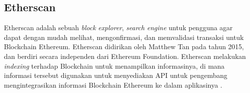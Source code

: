 \subsection{Etherscan}
\label{subsec:etherscan}

Etherscan adalah sebuah \textit{block explorer}, \textit{search engine} untuk pengguna agar dapat dengan mudah melihat, mengonfirmasi, dan memvalidasi transaksi untuk Blockchain Ethereum. Etherscan didirikan oleh Matthew Tan pada tahun 2015, dan berdiri secara independen dari Ethereum Foundation. Etherscan melakukan \textit{indexing} terhadap Blockchain untuk menampilkan informasinya, di mana informasi tersebut digunakan untuk menyediakan API untuk pengembang mengintegrasikan informasi Blockchain Ethereum ke dalam aplikasinya \parencite{etherscan2024}.